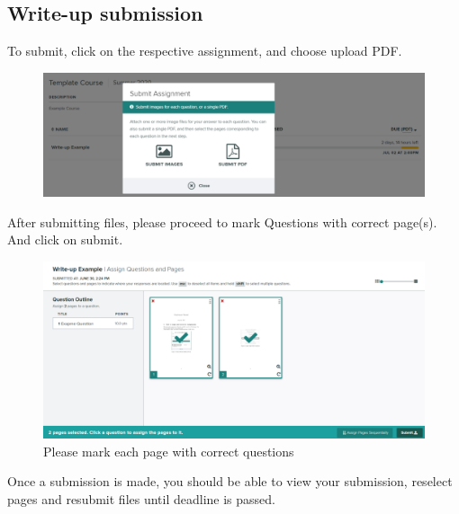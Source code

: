 \documentclass{article}
\begin{document}
\subsection{Write-up submission}
\hspace{\parindent}To submit, click on the respective assignment, and choose upload PDF.
\begin{figure}[H]
\centerline{\includegraphics[scale=.25]{submit_1.png}}
\label{fig}
\end{figure}
After submitting files, please proceed to mark Questions with correct page(s). And click on submit. 
\begin{figure}[H]
\centerline{\includegraphics[scale=.25]{submit_2.png}}
\caption{Please mark each page with correct questions}
\label{fig}
\end{figure}
Once a submission is made, you should be able to view your submission, reselect pages and resubmit files until deadline is passed.
\end{document}
